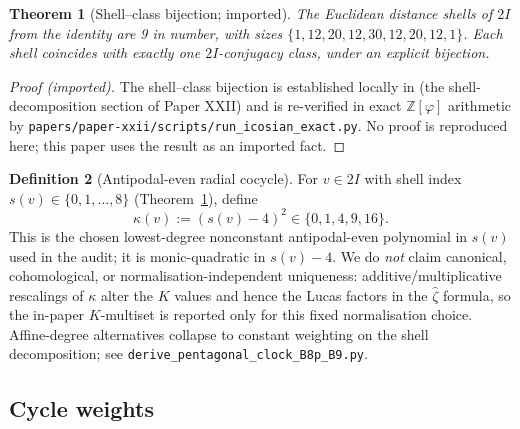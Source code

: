 \documentclass[11pt, a4paper]{amsart}
\newtheorem{theorem}{Theorem}[section]
\theoremstyle{definition}
\newtheorem{definition}[theorem]{Definition}
\newcommand{\Z}{\mathbb{Z}}
\begin{document}
\begin{theorem}[Shell--class bijection; imported]\label{thm:shell_class}
The Euclidean distance shells of $2I$ from the identity are 9 in
number, with sizes $\{1, 12, 20, 12, 30, 12, 20, 12, 1\}$. Each
shell coincides with exactly one $2I$-conjugacy class, under an
explicit bijection.
\end{theorem}

\begin{proof}[Proof (imported)]
The shell--class bijection is established locally in
\cite[lines 204--223]{PaperXXII} (the shell-decomposition section
of Paper XXII) and is re-verified in exact $\Z[\varphi]$
arithmetic by
\texttt{papers/paper-xxii/scripts/run\_icosian\_exact.py}.  No
proof is reproduced here; this paper uses the result as an
imported fact.
\end{proof}

\begin{definition}[Antipodal-even radial cocycle]\label{def:kappa}
For $v \in 2I$ with shell index $s(v) \in \{0, 1, \ldots, 8\}$
(Theorem~\ref{thm:shell_class}), define
\[
\kappa(v) := (s(v) - 4)^2 \in \{0, 1, 4, 9, 16\}.
\]
This is the chosen lowest-degree nonconstant antipodal-even
polynomial in $s(v)$ used in the audit; it is monic-quadratic in
$s(v)-4$.  We do \emph{not} claim canonical, cohomological, or
normalisation-independent uniqueness: additive/multiplicative
rescalings of $\kappa$ alter the $K$ values and hence the Lucas
factors in the $\widehat\zeta$ formula, so the in-paper
$K$-multiset is reported only for this fixed normalisation
choice.  Affine-degree alternatives collapse to constant weighting
on the shell decomposition; see
\texttt{derive\_pentagonal\_clock\_B8p\_B9.py}.
\end{definition}

\subsection{Cycle weights}\label{subsec:K}
\end{document}
